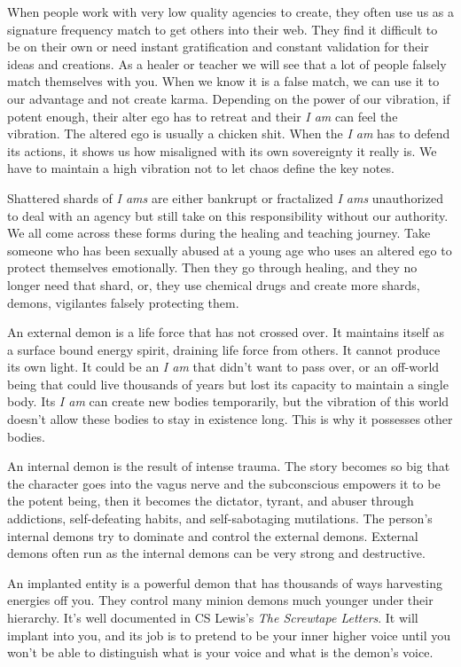 When people work with very low quality agencies to create, they often
use us as a signature frequency match to get others into their web. They
find it difficult to be on their own or need instant gratification and
constant validation for their ideas and creations. As a healer or
teacher we will see that a lot of people falsely match themselves with
you. When we know it is a false match, we can use it to our advantage
and not create karma. Depending on the power of our vibration, if potent
enough, their alter ego has to retreat and their \emph{I am} can feel
the vibration. The altered ego is usually a chicken shit. When the
\emph{I am} has to defend its actions, it shows us how misaligned with
its own sovereignty it really is. We have to maintain a high vibration
not to let chaos define the key notes.

Shattered shards of \emph{I ams} are either bankrupt or fractalized
\emph{I ams} unauthorized to deal with an agency but still take on this
responsibility without our authority. We all come across these forms
during the healing and teaching journey. Take someone who has been
sexually abused at a young age who uses an altered ego to protect
themselves emotionally. Then they go through healing, and they no longer
need that shard, or, they use chemical drugs and create more shards,
demons, vigilantes falsely protecting them.

An external demon is a life force that has not crossed over. It
maintains itself as a surface bound energy spirit, draining life force
from others. It cannot produce its own light. It could be an \emph{I am}
that didn't want to pass over, or an off-world being that could live
thousands of years but lost its capacity to maintain a single body. Its
\emph{I am} can create new bodies temporarily, but the vibration of this
world doesn't allow these bodies to stay in existence long. This is why
it possesses other bodies.

An internal demon is the result of intense trauma. The story becomes so
big that the character goes into the vagus nerve and the subconscious
empowers it to be the potent being, then it becomes the dictator,
tyrant, and abuser through addictions, self-defeating habits, and
self-sabotaging mutilations. The person's internal demons try to
dominate and control the external demons. External demons often run as
the internal demons can be very strong and destructive.

An implanted entity is a powerful demon that has thousands of ways
harvesting energies off you. They control many minion demons much
younger under their hierarchy. It's well documented in CS Lewis's
\emph{The Screwtape Letters}. It will implant into you, and its job is
to pretend to be your inner higher voice until you won't be able to
distinguish what is your voice and what is the demon's voice.

